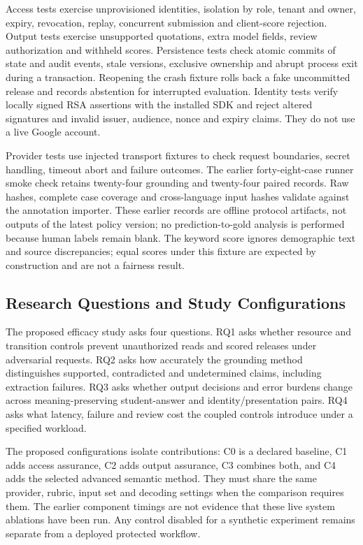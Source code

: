\documentclass[conference]{IEEEtran}
\begin{document}
Access tests exercise unprovisioned identities, isolation by role, tenant and owner, expiry, revocation, replay, concurrent submission and client-score rejection. Output tests exercise unsupported quotations, extra model fields, review authorization and withheld scores. Persistence tests check atomic commits of state and audit events, stale versions, exclusive ownership and abrupt process exit during a transaction. Reopening the crash fixture rolls back a fake uncommitted release and records abstention for interrupted evaluation. Identity tests verify locally signed RSA assertions with the installed SDK and reject altered signatures and invalid issuer, audience, nonce and expiry claims. They do not use a live Google account.

Provider tests use injected transport fixtures to check request boundaries, secret handling, timeout abort and failure outcomes. The earlier forty-eight-case runner smoke check retains twenty-four grounding and twenty-four paired records. Raw hashes, complete case coverage and cross-language input hashes validate against the annotation importer. These earlier records are offline protocol artifacts, not outputs of the latest policy version; no prediction-to-gold analysis is performed because human labels remain blank. The keyword score ignores demographic text and source discrepancies; equal scores under this fixture are expected by construction and are not a fairness result.

\subsection{Research Questions and Study Configurations}
The proposed efficacy study asks four questions. RQ1 asks whether resource and transition controls prevent unauthorized reads and scored releases under adversarial requests. RQ2 asks how accurately the grounding method distinguishes supported, contradicted and undetermined claims, including extraction failures. RQ3 asks whether output decisions and error burdens change across meaning-preserving student-answer and identity/presentation pairs. RQ4 asks what latency, failure and review cost the coupled controls introduce under a specified workload.

The proposed configurations isolate contributions: C0 is a declared baseline, C1 adds access assurance, C2 adds output assurance, C3 combines both, and C4 adds the selected advanced semantic method. They must share the same provider, rubric, input set and decoding settings when the comparison requires them. The earlier component timings are not evidence that these live system ablations have been run. Any control disabled for a synthetic experiment remains separate from a deployed protected workflow.
\end{document}
